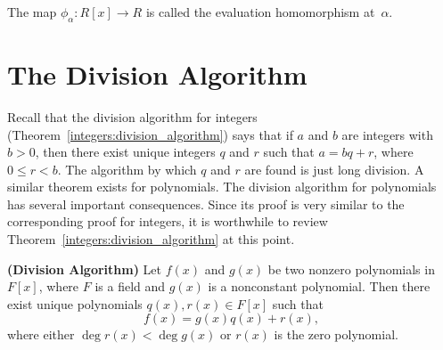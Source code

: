 \medskip

The map  $\phi_{\alpha} : R[x] \rightarrow R$ is called the {\bfi evaluation homomorphism\/} at~$\alpha$. 
 

\section{The Division Algorithm}

Recall that the division algorithm for integers (Theorem~\ref{integers:division_algorithm}) says
that if $a$ and $b$ are integers with $b>0$, then there exist unique
integers $q$ and $r$ such that $a = bq+r$, where $0 \leq r < b$. The
algorithm by which $q$ and $r$ are found is just long division.  A
similar theorem exists for polynomials.	The division algorithm for
polynomials has several important consequences. Since its proof is
very similar to the corresponding proof for integers, it is worthwhile
to review Theorem~\ref{integers:division_algorithm} at this point.  
 
 
\begin{theorem} 
{\bf (Division Algorithm)} Let $f(x)$ and $g(x)$ be two
nonzero polynomials in $F[x]$, where $F$ is a field and  $g(x)$ is a
nonconstant polynomial.  Then there exist unique polynomials $q(x),
r(x) \in F[x]$ such that 
\[
f(x) = g(x) q(x) + r(x),
\]
where either  $\deg r(x) < \deg g(x)$ or $r(x)$ is the zero
polynomial. 
\end{theorem}
 
